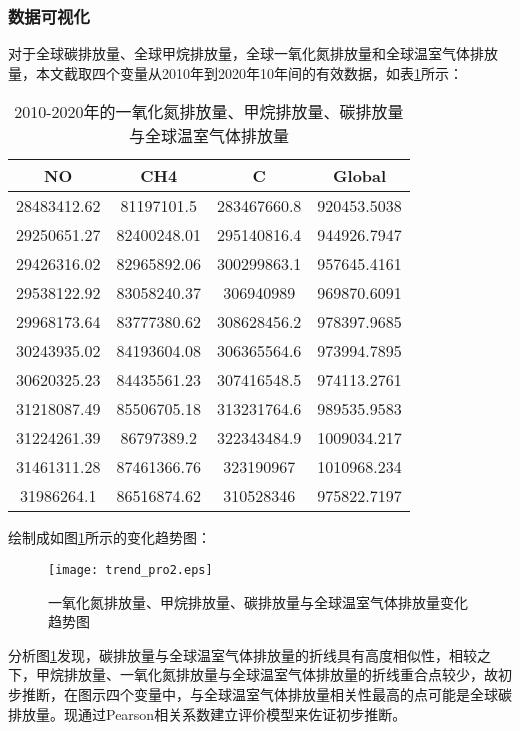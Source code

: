 \documentclass[withoutpreface,bwprint]{cumcmthesis}
\begin{document}
	\subsubsection{数据可视化}
对于全球碳排放量、全球甲烷排放量，全球一氧化氮排放量和全球温室气体排放量，本文截取四个变量从2010年到2020年10年间的有效数据，如表\ref{tab:1}所示：
	\begin{table}[htbp]
	\centering
	\caption{2010-2020年的一氧化氮排放量、甲烷排放量、碳排放量与全球温室气体排放量}
	\begin{tabular}{cccc} 
		\hline
		NO          & CH4         & C           & Global       \\ 
		\hline
		28483412.62 & 81197101.5  & 283467660.8 & 920453.5038  \\
		29250651.27 & 82400248.01 & 295140816.4 & 944926.7947  \\
		29426316.02 & 82965892.06 & 300299863.1 & 957645.4161  \\
		29538122.92 & 83058240.37 & 306940989   & 969870.6091  \\
		29968173.64 & 83777380.62 & 308628456.2 & 978397.9685  \\
		30243935.02 & 84193604.08 & 306365564.6 & 973994.7895  \\
		30620325.23 & 84435561.23 & 307416548.5 & 974113.2761  \\
		31218087.49 & 85506705.18 & 313231764.6 & 989535.9583  \\
		31224261.39 & 86797389.2  & 322343484.9 & 1009034.217  \\
		31461311.28 & 87461366.76 & 323190967   & 1010968.234  \\
		31986264.1  & 86516874.62 & 310528346   & 975822.7197  \\
		\hline
	\end{tabular}
	\label{tab:1}
\end{table}


绘制成如图\ref{fig:trendpro2}所示的变化趋势图：

\begin{figure}[htbp]
	\centering
	\texttt{[image: trend\_pro2.eps]}
	\caption{一氧化氮排放量、甲烷排放量、碳排放量与全球温室气体排放量变化趋势图}
	\label{fig:trendpro2}
\end{figure}

分析图\ref{fig:trendpro2}发现，碳排放量与全球温室气体排放量的折线具有高度相似性，相较之下，甲烷排放量、一氧化氮排放量与全球温室气体排放量的折线重合点较少，故初步推断，在图示四个变量中，与全球温室气体排放量相关性最高的点可能是全球碳排放量。现通过Pearson相关系数建立评价模型来佐证初步推断。
\end{document}
